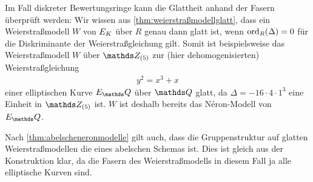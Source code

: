 \begin{Bemerkung}
  Im Fall diskreter Bewertungsringe kann die Glattheit anhand der Fasern
  überprüft werden:
  Wir wissen aus \ref{thm:weierstraßmodellglatt},
  dass ein Weierstraßmodell $W$ von $E_{K}$ über $R$ genau dann glatt
  ist, wenn $\operatorname{ord}_R(\Delta)=0$ für die Diskriminante der
  Weierstraßgleichung gilt.
  Somit ist beispielsweise das Weierstraßmodell $W$ über $\Z_{(5)}$
  zur (hier dehomogenisierten) Weierstraßgleichung
  \begin{gather*}
    y^2=x^3+x
  \end{gather*}
  einer elliptischen Kurve $E_\Q$ über $\Q$ glatt, da
  $\Delta=-16\cdot4\cdot1^3$ eine Einheit in $\Z_{(5)}$ ist.
  $W$ ist deshalb bereits das Néron-Modell von $E_\Q$.

  Nach \ref{thm:abelscheneronmodelle} gilt auch, dass die
  Gruppenstruktur auf glatten Weierstraßmodellen die eines abelschen
  Schemas ist.
  Dies ist gleich aus der Konstruktion klar, da die Fasern des
  Weierstraßmodells in diesem Fall ja alle elliptische Kurven sind.
\end{Bemerkung}

